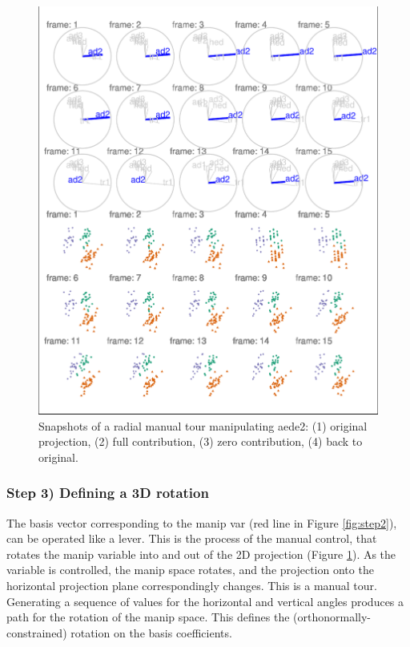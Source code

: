 \begin{Schunk}
\begin{figure}

{\centering \includegraphics[width=1\linewidth]{spinifex_paper_files/figure-latex/step3-1} 

}

\caption[Snapshots of a radial manual tour manipulating aede2]{Snapshots of a radial manual tour manipulating aede2: (1) original projection, (2) full contribution, (3) zero contribution, (4) back to original. }\label{fig:step3}
\end{figure}
\end{Schunk}

\hypertarget{step-3-defining-a-3d-rotation}{%
\subsubsection{Step 3) Defining a 3D
rotation}\label{step-3-defining-a-3d-rotation}}

The basis vector corresponding to the manip var (red line in Figure
\ref{fig:step2}), can be operated like a lever. This is the process of
the manual control, that rotates the manip variable into and out of the
2D projection (Figure \ref{fig:step3}). As the variable is controlled,
the manip space rotates, and the projection onto the horizontal
projection plane correspondingly changes. This is a manual tour.
Generating a sequence of values for the horizontal and vertical angles
produces a path for the rotation of the manip space. This defines the
(orthonormally-constrained) rotation on the basis coefficients.

